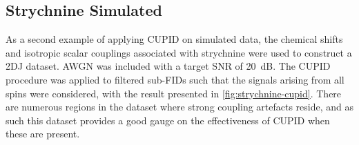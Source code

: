 
\subsection{Strychnine Simulated}
\label{subsec:strychnine-cupid}
As a second example of applying \ac{CUPID} on simulated data, the chemical
shifts and isotropic scalar couplings associated with strychnine
were used to construct a 2DJ dataset. \ac{AWGN} was included with a target
\ac{SNR} of \qty{20}{\deci\bel}. The CUPID procedure was applied to filtered
sub-FIDs such that the signals arising from all spins were considered, with the
result presented in \cref{fig:strychnine-cupid}. There are numerous
regions in the dataset where strong coupling artefacts reside, and as such this
dataset provides a good gauge on the effectiveness of \ac{CUPID} when these are
present.

